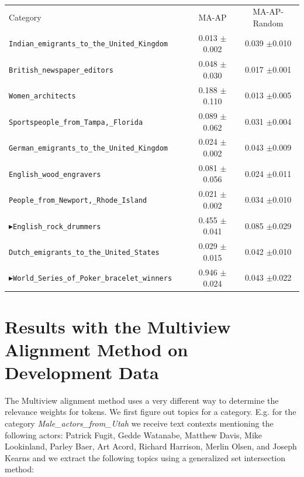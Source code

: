\documentclass{article}
\renewcommand{\bullet}[0]{$\blacktriangleright$}
\begin{document}
\begin{table}[htbp]
  \centering
  \begin{tabular}{l | c  | c }\toprule
    Category & MA-AP & MA-AP-Random \\
\verb|Indian_emigrants_to_the_United_Kingdom    |          & 0.013 $\pm$0.002 & 0.039 $\pm$0.010 \\
\verb|British_newspaper_editors                 |          & 0.048 $\pm$0.030 & 0.017 $\pm$0.001 \\
\verb|Women_architects                          |          & 0.188 $\pm$0.110 & 0.013 $\pm$0.005 \\
\verb|Sportspeople_from_Tampa,_Florida          |          & 0.089 $\pm$0.062 & 0.031 $\pm$0.004 \\
\verb|German_emigrants_to_the_United_Kingdom    |          & 0.024 $\pm$0.002 & 0.043 $\pm$0.009 \\
\verb|English_wood_engravers                    |          & 0.081 $\pm$0.056 & 0.024 $\pm$0.011 \\
\verb|People_from_Newport,_Rhode_Island         |          & 0.021 $\pm$0.002 & 0.034 $\pm$0.010 \\
\bullet{\verb|English_rock_drummers             |}         & 0.455 $\pm$0.041 & 0.085 $\pm$0.029 \\
\verb|Dutch_emigrants_to_the_United_States      |          & 0.029 $\pm$0.015 & 0.042 $\pm$0.010 \\
\bullet{\verb|World_Series_of_Poker_bracelet_winners    |} & 0.946 $\pm$0.024 & 0.043 $\pm$0.022 \\
\bottomrule\end{tabular}
  \caption{}
  \label{tab:feat-select-doc-80}
\end{table}
\clearpage
\section{Results with the Multiview
  Alignment Method on Development Data}
\label{sec:results-with-mult}

The Multiview alignment method uses a very different way to determine the
relevance weights for tokens. We first figure out topics for a category. E.g.
for the category \textit{Male\_actors\_from\_Utah} we receive text contexts mentioning
the following actors: Patrick Fugit, Gedde Watanabe, Matthew Davis, Mike
Lookinland, Parley Baer, Art Acord, Richard Harrison, Merlin Olsen, and Joseph
Kearns and we extract the following topics using a generalized set intersection
method:
\end{document}
